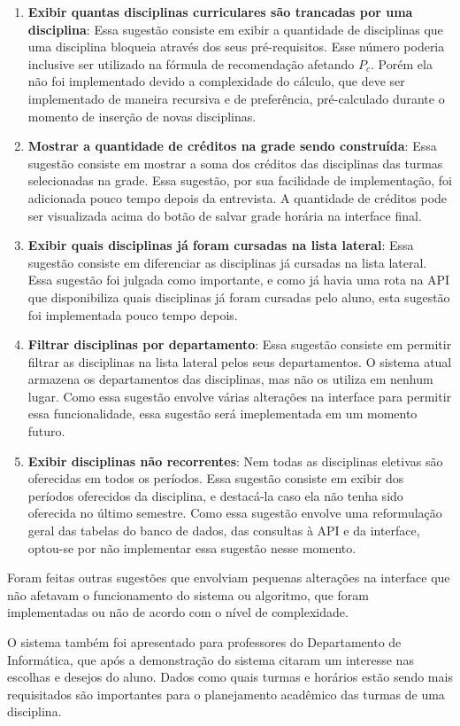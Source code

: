 \begin{enumerate}
    \item \textbf{Exibir quantas disciplinas curriculares são trancadas por uma disciplina}: Essa sugestão consiste em exibir a quantidade de disciplinas que uma disciplina bloqueia através dos seus pré-requisitos. Esse número poderia inclusive ser utilizado na fórmula de recomendação afetando $P_c$. Porém ela não foi implementado devido a complexidade do cálculo, que deve ser implementado de maneira recursiva e de preferência, pré-calculado durante o momento de inserção de novas disciplinas.
    
    \item \textbf{Mostrar a quantidade de créditos na grade sendo construída}: Essa sugestão consiste em mostrar a soma dos créditos das disciplinas das turmas selecionadas na grade. Essa sugestão, por sua facilidade de implementação, foi adicionada pouco tempo depois da entrevista. A quantidade de créditos pode ser visualizada acima do botão de salvar grade horária na interface final.
    
    \item \textbf{Exibir quais disciplinas já foram cursadas na lista lateral}: Essa sugestão consiste em diferenciar as disciplinas já cursadas na lista lateral. Essa sugestão foi julgada como importante, e como já havia uma rota na API que disponibiliza quais disciplinas já foram cursadas pelo aluno, esta sugestão foi implementada pouco tempo depois.

    \item \textbf{Filtrar disciplinas por departamento}: Essa sugestão consiste em permitir filtrar as disciplinas na lista lateral pelos seus departamentos. O sistema atual armazena os departamentos das disciplinas, mas não os utiliza em nenhum lugar. Como essa sugestão envolve várias alterações na interface para permitir essa funcionalidade, essa sugestão será imeplementada em um momento futuro.
    
    \item \textbf{Exibir disciplinas não recorrentes}: Nem todas as disciplinas eletivas são oferecidas em todos os períodos. Essa sugestão consiste em exibir dos períodos oferecidos da disciplina, e destacá-la caso ela não tenha sido oferecida no último semestre. Como essa sugestão envolve uma reformulação geral das tabelas do banco de dados, das consultas à API e da interface, optou-se por não implementar essa sugestão nesse momento. 
\end{enumerate}

Foram feitas outras sugestões que envolviam pequenas alterações na interface que não afetavam o funcionamento do sistema ou algoritmo, que foram implementadas ou não de acordo com o nível de complexidade.

O sistema também foi apresentado para professores do Departamento de Informática, que após a demonstração do sistema citaram um interesse nas escolhas e desejos do aluno. Dados como quais turmas e horários estão sendo mais requisitados são importantes para o planejamento acadêmico das turmas de uma disciplina.